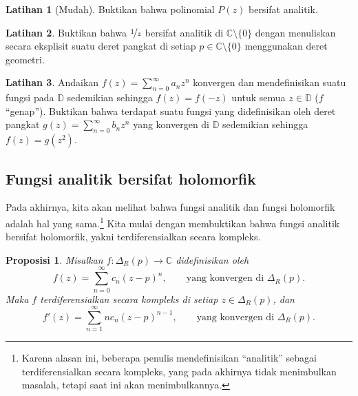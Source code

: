 \documentclass[12pt,openany]{book}
\newcommand{\C}{{\mathbb{C}}}
\newcommand{\D}{{\mathbb{D}}}
\newcommand{\myquote}[1]{``#1''}
\theoremstyle{plain}
\newtheorem{prop}[thm]{Proposisi}
\theoremstyle{remark}
\theoremstyle{definition}
\newenvironment{exbox}{%
    \def\FrameCommand{\vrule width 1pt \relax\hspace{10pt}}%
    \MakeFramed{\advance\hsize-\width\FrameRestore}%
}{%
    \endMakeFramed
}
\theoremstyle{exercise}
\newtheorem{exercise}{Latihan}[section]
\theoremstyle{example}
\begin{document}
\begin{exbox}
\begin{exercise}[Mudah]
Buktikan bahwa polinomial $P(z)$ bersifat analitik.
\end{exercise}

\begin{exercise}
Buktikan bahwa $\nicefrac{1}{z}$ bersifat analitik di $\C \setminus \{ 0 \}$
dengan menuliskan secara eksplisit
suatu deret pangkat di setiap $p \in \C \setminus \{ 0 \}$
menggunakan deret geometri.
\end{exercise}

\begin{exercise}
Andaikan $f(z) = \sum_{n=0}^\infty a_n z^n$ konvergen dan mendefinisikan suatu
fungsi pada $\D$ sedemikian sehingga $f(z) = f(-z)$ untuk semua $z \in \D$ ($f$
\myquote{genap}).
Buktikan bahwa terdapat suatu fungsi yang didefinisikan oleh deret pangkat
$g(z) = \sum_{n=0}^\infty b_n z^n$ yang konvergen di $\D$ sedemikian sehingga
$f(z) = g(z^2)$.
\end{exercise}
\end{exbox}

\subsection{Fungsi analitik bersifat holomorfik}

Pada akhirnya, kita akan melihat bahwa fungsi analitik dan fungsi holomorfik
adalah hal yang sama.\footnote{%
Karena alasan ini, beberapa penulis mendefinisikan \myquote{analitik} sebagai terdiferensialkan secara kompleks,
yang pada akhirnya tidak menimbulkan masalah, tetapi saat ini akan menimbulkannya.}
Kita mulai dengan membuktikan bahwa
fungsi analitik bersifat holomorfik, yakni terdiferensialkan secara
kompleks.

\begin{prop}
\pagebreak[2]
Misalkan $f \colon \Delta_R(p) \to \C$ didefinisikan oleh
\begin{equation*}
f(z) = \sum_{n=0}^\infty c_n {(z-p)}^n ,
\qquad \text{yang konvergen di } \Delta_R(p) .
\end{equation*}
Maka $f$ terdiferensialkan secara kompleks di setiap $z \in \Delta_R(p)$, dan
\begin{equation*}
f'(z) = \sum_{n=1}^\infty n c_n {(z-p)}^{n-1} ,
\qquad \text{yang konvergen di } \Delta_R(p) .
\end{equation*}
\end{prop}
\end{document}

